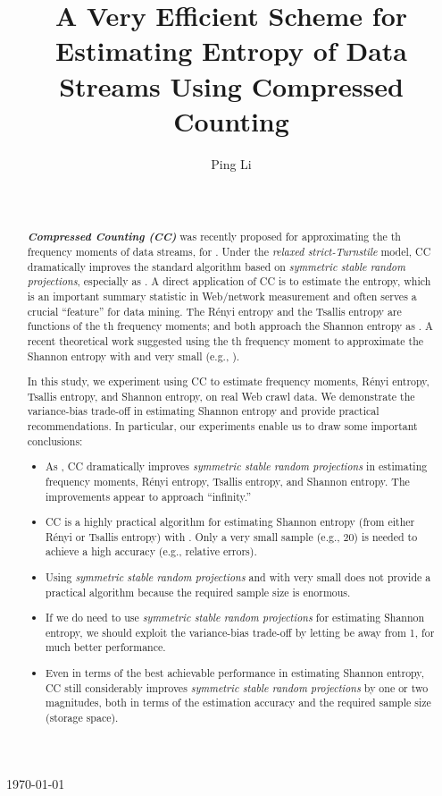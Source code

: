 \documentclass{sig-alternate}
\begin{document}
\title{A Very Efficient Scheme for Estimating Entropy of Data Streams Using Compressed Counting}


\author{
\alignauthor
Ping Li\\
       \\
              \\
}


\maketitle

\noindent \today
\begin{abstract}
\textbf{\em Compressed Counting (CC)} was recently proposed for approximating the th frequency moments of data streams, for . Under the {\em relaxed strict-Turnstile} model, CC dramatically improves the standard  algorithm based on {\em symmetric stable random projections}, especially as .
A direct application of CC is to estimate the entropy, which is an important summary statistic in Web/network measurement and often serves a crucial ``feature'' for data mining.  The R\'enyi entropy and the Tsallis entropy  are functions of the th frequency moments; and both approach the Shannon entropy as . A recent theoretical work suggested using the th frequency moment to approximate the Shannon entropy with  and very small  (e.g., ).


In this study, we experiment using CC to estimate frequency moments, R\'enyi entropy, Tsallis entropy, and  Shannon entropy, on real Web crawl data. We demonstrate the variance-bias trade-off in estimating  Shannon entropy and provide practical recommendations. In particular, our experiments enable us to draw some important conclusions:
\begin{itemize}
\item As , CC dramatically improves {\em symmetric stable random projections} in estimating frequency moments, R\'enyi entropy, Tsallis entropy, and Shannon entropy. The improvements appear to approach ``infinity.''
\item CC is a highly practical algorithm for estimating Shannon entropy (from either R\'enyi or Tsallis entropy) with . Only a very small sample (e.g., 20) is needed to achieve a high accuracy (e.g.,  relative errors).
\item Using {\em symmetric stable random projections} and  with very small  does not provide a practical algorithm because the required sample size is enormous.
\item If we do need to use {\em symmetric stable random projections} for estimating Shannon entropy, we should exploit the variance-bias trade-off by letting  be away from 1, for much better performance.
\item Even in terms of the best achievable performance in estimating Shannon entropy, CC still considerably improves {\em symmetric stable random projections} by one or two magnitudes, both in terms of the estimation accuracy and the required sample size (storage space). 
\end{itemize}


\end{abstract}
\end{document}

